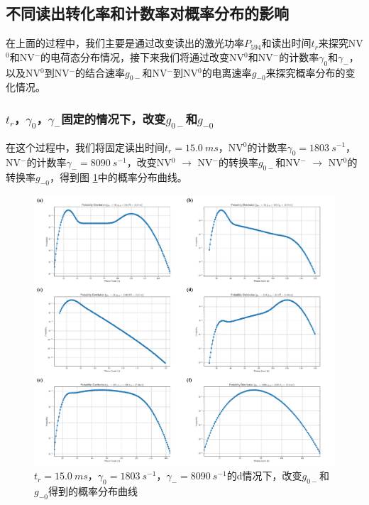 \documentclass[type = bachelor]{whu-thesis}
\begin{document}
\subsection{不同读出转化率和计数率对概率分布的影响}

在上面的过程中，我们主要是通过改变读出的激光功率$P_{594}$和读出时间$t_r$来探究NV$^0$和NV$^-$的电荷态分布情况，接下来我们将通过改变NV$^0$和NV$^-$的计数率$\gamma_0$和$\gamma_-$，以及NV$^0$到NV$^-$的结合速率$g_{0-}$和NV$^-$到NV$^0$的电离速率$g_{-0}$来探究概率分布的变化情况。

\subsubsection{$t_r$，$\gamma_0$，$\gamma_-$固定的情况下，改变$g_{0-}$和$g_{-0}$}
在这个过程中，我们将固定读出时间$t_r = 15.0\ ms$，NV$^0$的计数率$\gamma_0 = 1803\ s^{-1}$，NV$^-$的计数率$\gamma_- = 8090\ s^{-1}$，改变NV$^0$ $\rightarrow$ NV$^-$的转换率$g_{0-}$和NV$^-$ $\rightarrow$ NV$^0$的转换率$g_{-0}$，得到图 \ref{fig: g_variation}中的概率分布曲线。
\begin{figure}
  \centering
  \includegraphics[width=1.0\textwidth]{figures/Chapter 5/g_variation.png}
  \caption[$t_r = 15.0\ ms$，$\gamma_0 = 1803\ s^{-1}$，$\gamma_- = 8090\ s^{-1}$的情况下，改变$g_{0-}$和$g_{-0}$（$s^{-1}$）得到的概率分布曲线]{$t_r = 15.0\ ms$，$\gamma_0 = 1803\ s^{-1}$，$\gamma_- = 8090\ s^{-1}$的d情况下，改变$g_{0-}$和$g_{-0}$得到的概率分布曲线}
  \label{fig: g_variation}
\end{figure}
\end{document}
